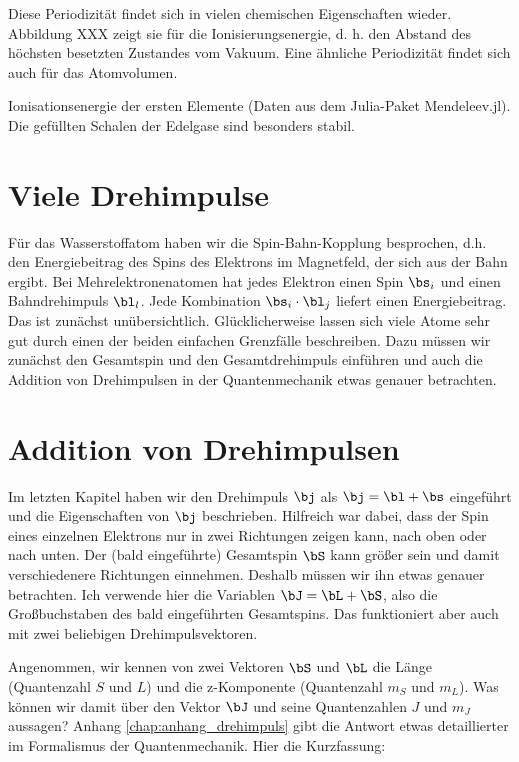 Diese Periodizität findet sich in vielen chemischen Eigenschaften wieder. Abbildung XXX zeigt sie für die Ionisierungsenergie, d. h. den Abstand des höchsten besetzten Zustandes vom Vakuum. Eine ähnliche Periodizität findet sich auch für das Atomvolumen.

\begin{marginfigure}
    \caption{Ionisationsenergie der ersten Elemente (Daten aus dem Julia-Paket Mendeleev.jl). Die gefüllten Schalen der Edelgase sind besonders stabil.}
\end{marginfigure}


\section{Viele Drehimpulse}


Für das Wasserstoffatom haben wir die Spin-Bahn-Kopplung besprochen, d.h. den Energiebeitrag des Spins des Elektrons im Magnetfeld, der sich aus der Bahn ergibt. Bei Mehrelektronenatomen hat jedes Elektron einen Spin $\bs_i$ und einen Bahndrehimpuls $\bl_l$. Jede Kombination $\bs_i \cdot \bl_j$ liefert einen Energiebeitrag. Das ist zunächst unübersichtlich. Glücklicherweise lassen sich viele Atome sehr gut durch einen der beiden einfachen Grenzfälle beschreiben. Dazu müssen wir zunächst den Gesamtspin und den Gesamtdrehimpuls einführen und auch die Addition von Drehimpulsen in der Quantenmechanik etwas genauer betrachten.


\section{Addition von Drehimpulsen}

Im letzten Kapitel haben wir den Drehimpuls $\bj$ als $\bj = \bl + \bs$ eingeführt und die Eigenschaften von $\bj$ beschrieben. Hilfreich war dabei, dass der Spin eines einzelnen Elektrons nur in zwei Richtungen zeigen kann, nach oben oder nach unten. Der (bald eingeführte) Gesamtspin $\bS$ kann größer sein und damit verschiedenere Richtungen einnehmen. Deshalb müssen wir ihn etwas genauer betrachten. Ich verwende hier die Variablen $\bJ = \bL + \bS$, also die Großbuchstaben des bald eingeführten Gesamtspins. Das funktioniert aber auch mit zwei beliebigen Drehimpulsvektoren.

Angenommen, wir kennen von zwei Vektoren $\bS$ und $\bL$ die Länge (Quantenzahl $S$ und $L$) und die z-Komponente (Quantenzahl $m_S$ und $m_L$). Was können wir damit über den Vektor $\bJ$ und seine Quantenzahlen $J$ und $m_J$ aussagen? Anhang \ref{chap:anhang_drehimpuls}
gibt die Antwort etwas detaillierter im Formalismus der Quantenmechanik. Hier die Kurzfassung:

